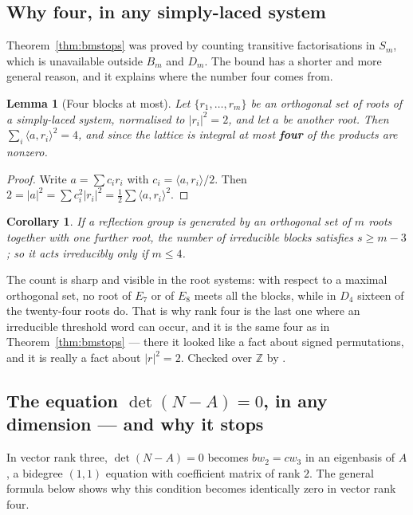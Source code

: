 \documentclass[11pt,a4paper]{article}
\theoremstyle{plain}
\newtheorem{lemma}[theorem]{Lemma}
\newtheorem{corollary}[theorem]{Corollary}
\theoremstyle{definition}
\theoremstyle{remark}
\begin{document}
\subsection{Why four, in any simply-laced system}

Theorem~\ref{thm:bmstops} was proved by counting transitive factorisations in $S_m$,
which is unavailable outside $B_m$ and $D_m$. The bound has a shorter and more
general reason, and it explains where the number four comes from.

\begin{lemma}[Four blocks at most]\label{lem:fourblocks}
Let $\{r_1,\dots,r_m\}$ be an orthogonal set of roots of a simply-laced system,
normalised to $|r_i|^2=2$, and let $a$ be another root. Then
$\sum_i\langle a,r_i\rangle^2=4$, and since the lattice is integral at most
\textbf{four} of the products are nonzero.
\end{lemma}

\begin{proof}
Write $a=\sum c_ir_i$ with $c_i=\langle a,r_i\rangle/2$. Then
$2=|a|^2=\sum c_i^2|r_i|^2=\tfrac12\sum\langle a,r_i\rangle^2$.
\end{proof}

\begin{corollary}\label{cor:fourblocks}
If a reflection group is generated by an orthogonal set of $m$ roots together with
one further root, the number of irreducible blocks satisfies $s\ge m-3$; so it acts
irreducibly only if $m\le4$.
\end{corollary}

The count is sharp and visible in the root systems: with respect to a maximal
orthogonal set, no root of $E_7$ or of $E_8$ meets all the blocks, while in $D_4$
sixteen of the twenty-four roots do. That is why rank four is the last one where an
irreducible threshold word can occur, and it is the same four as in
Theorem~\ref{thm:bmstops} --- there it looked like a fact about signed permutations,
and it is really a fact about $|r|^2=2$. Checked over $\mathbb{Z}$ by
.

\subsection{The equation $\det(N-A)=0$, in any dimension --- and why it stops}

In vector rank three, $\det(N-A)=0$ becomes $bw_2=cw_3$ in an eigenbasis of
$A$, a bidegree $(1,1)$ equation with coefficient matrix of rank $2$. The general
formula below shows why this condition becomes identically zero in vector rank four.
\end{document}

